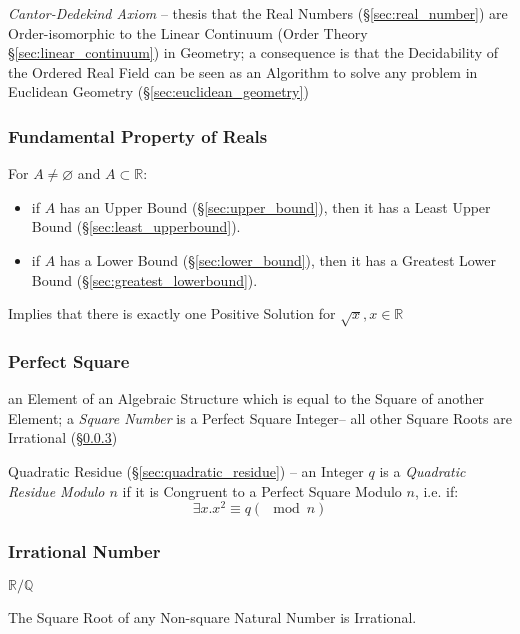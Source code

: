 \emph{Cantor-Dedekind Axiom} -- thesis that the Real Numbers
(\S\ref{sec:real_number}) are Order-isomorphic to the Linear Continuum (Order
Theory \S\ref{sec:linear_continuum}) in Geometry; a consequence is that the
Decidability of the Ordered Real Field can be seen as an Algorithm to solve any
problem in Euclidean Geometry (\S\ref{sec:euclidean_geometry})



\subsubsection{Fundamental Property of Reals}
\label{sec:fundamental_property}

For $A \neq \varnothing$ and $A \subset \mathbb{R}$:
\begin{itemize}
  \item if $A$ has an Upper Bound (\S\ref{sec:upper_bound}), then it
    has a Least Upper Bound (\S\ref{sec:least_upperbound}).
  \item if $A$ has a Lower Bound (\S\ref{sec:lower_bound}), then it
    has a Greatest Lower Bound (\S\ref{sec:greatest_lowerbound}).
\end{itemize}

Implies that there is exactly one Positive Solution for
$\sqrt{x}, x \in \mathbb{R}$



\subsubsection{Perfect Square}\label{sec:perfect_square}

an Element of an Algebraic Structure which is equal to the Square of another
Element; a \emph{Square Number} is a Perfect Square Integer--
all other Square Roots are Irrational (\S\ref{sec:irrational})

\fist Quadratic Residue (\S\ref{sec:quadratic_residue}) -- an Integer $q$ is a
\emph{Quadratic Residue Modulo $n$} if it is Congruent to a Perfect Square
Modulo $n$, i.e. if:
\[
  \exists x . x^2 \equiv q (\mod n)
\]



\subsubsection{Irrational Number}\label{sec:irrational}

$\mathbb{R}/\mathbb{Q}$

The Square Root of any Non-square Natural Number is Irrational.

